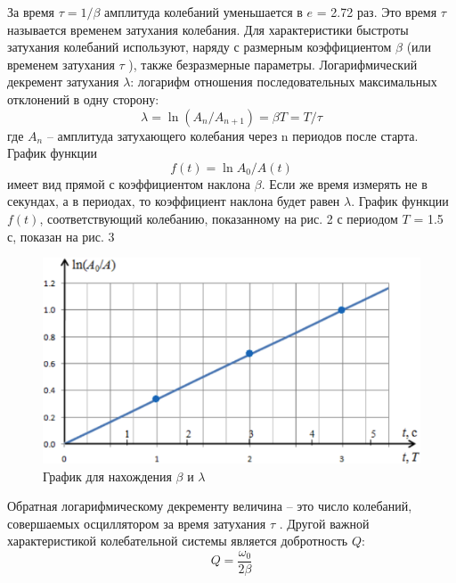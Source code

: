 \documentclass[a4paper]{article}
\begin{document}
За время $\tau=1/\beta$ амплитуда колебаний уменьшается в $e$ =
2.72 раз. Это время $\tau$ называется временем затухания колебания. Для характеристики быстроты затухания колебаний используют, наряду с размерным коэффициентом $\beta$ (или временем
затухания $\tau$ ), также безразмерные параметры.
Логарифмический декремент затухания $\lambda$: логарифм отношения последовательных максимальных отклонений в одну сторону:
\begin{equation}
	\lambda=\ln{(A_n/A_{n+1})}=\beta T=T/\tau
\end{equation}
где $A_n$ – амплитуда затухающего колебания через n периодов
после старта.\\
График функции
\begin{equation}
	f(t)=\ln{A_0/A(t)}
\end{equation}
имеет вид прямой с коэффициентом наклона $\beta$. Если же время
измерять не в секундах, а в периодах, то коэффициент наклона
будет равен $\lambda$. График функции $f(t)$, соответствующий колебанию, показанному на рис. 2 с периодом $T$ = 1.5 с, показан на рис. 3
\begin{figure}[H]
\begin{center}
\includegraphics[scale=0.4]{pick_3.png}
\caption{График для нахождения $\beta$ и $\lambda$}
\end{center}
\end{figure}
Обратная логарифмическому декременту величина – это число колебаний, совершаемых осциллятором за время затухания $\tau$ .
Другой важной характеристикой колебательной системы является добротность $Q$:
\begin{equation}
	Q=\dfrac{\omega_0}{2\beta}
\end{equation}
\end{document}
